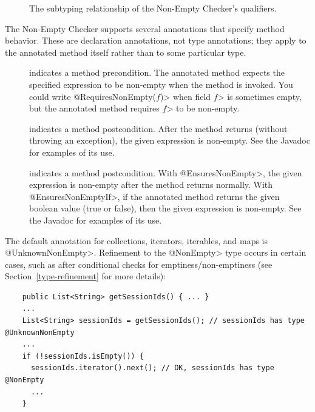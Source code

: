 \begin{figure}
\caption{The subtyping relationship of the Non-Empty Checker's qualifiers.}
\label{fig-nonempty-hierarchy}
\end{figure}


The Non-Empty Checker supports several annotations that specify method
behavior.  These are declaration annotations, not type annotations; they
apply to the annotated method itself rather than to some particular type.

\begin{description}

\item[]
  indicates a method precondition.  The annotated method expects the
  specified expression to be non-empty when the
  method is invoked.  You could write \<@RequiresNonEmpty($f$)> when field
  \<$f$> is sometimes empty, but the annotated method requires
  \<$f$> to be non-empty.

\item[]
  indicates a method postcondition.  After the method returns (without
  throwing an exception), the given
  expression is non-empty. See the Javadoc for examples of its use.

\item[]
  indicates a method postcondition.  With \<@EnsuresNonEmpty>, the given
  expression is non-empty after the method returns normally.  With
  \<@EnsuresNonEmptyIf>, if the annotated
  method returns the given boolean value (true or false), then the given
  expression is non-empty. See the Javadoc for examples of its use.

\end{description}



The default annotation for collections, iterators, iterables, and maps is
\<@UnknownNonEmpty>.
Refinement to the \<@NonEmpty> type occurs in certain cases, such as after
conditional checks for emptiness/non-emptiness (see Section~\ref{type-refinement} for
more details):

\begin{Verbatim}
    public List<String> getSessionIds() { ... }
    ...
    List<String> sessionIds = getSessionIds(); // sessionIds has type @UnknownNonEmpty
    ...
    if (!sessionIds.isEmpty()) {
      sessionIds.iterator().next(); // OK, sessionIds has type @NonEmpty
      ...
    }
\end{Verbatim}

